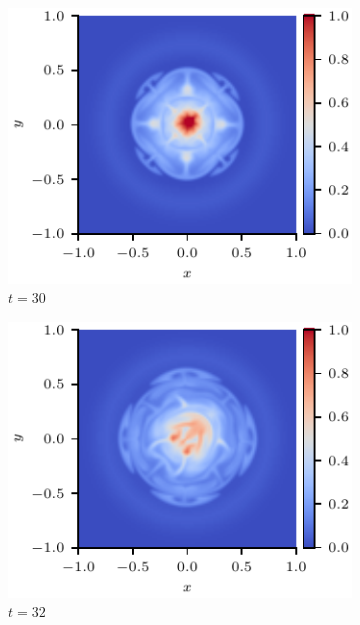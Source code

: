 \documentclass[fleqn,usenatbib]{mnras}
\begin{document}
\begin{figure}
\begin{subfigure}{0.32\textwidth}
      \includegraphics[width=\linewidth]{swi-3_pressure_15.pdf}
      \caption{$t=30$}
      \label{fig:swi-3_pressure_15}
    \end{subfigure}
    \hfill
    \begin{subfigure}{0.32\textwidth}
      \includegraphics[width=\linewidth]{swi-3_pressure_16.pdf}
      \caption{$t=32$}
      \label{fig:swi-3_pressure_16}
    \end{subfigure}
    \hfill
    \begin{subfigure}{0.32\textwidth}

\end{subfigure}
\end{figure}
\end{document}
